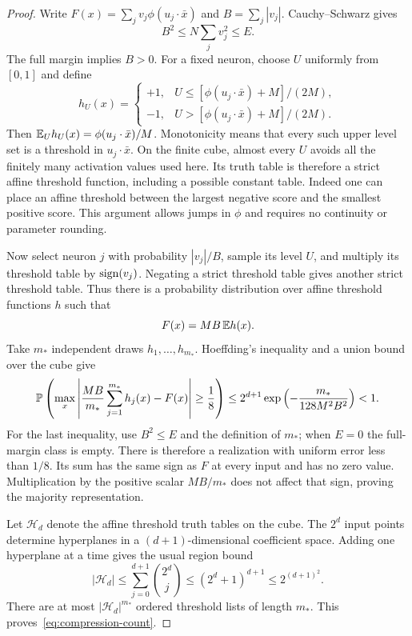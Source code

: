 \begin{proof}
Write $F(x)=\sum_j v_j\phi(u_j\cdot\bar x)$ and
$B=\sum_j|v_j|$. Cauchy--Schwarz gives
\[
 B^2\le N\sum_jv_j^2\le E.
\]
The full margin implies $B>0$.
For a fixed neuron, choose $U$ uniformly from $[0,1]$ and define
\[
 h_U(x)=
 \begin{cases}
 +1,&U\le[\phi(u_j\cdot\bar x)+M]/(2M),\\
 -1,&U>[\phi(u_j\cdot\bar x)+M]/(2M).
 \end{cases}
\]
Then $\mathbb E_U h_U(x)=\phi(u_j\cdot\bar x)/M$.
Monotonicity means that every such upper level set is a threshold in
$u_j\cdot\bar x$. On the finite cube, almost every $U$ avoids all the
finitely many activation values used here. Its truth table is therefore
a strict affine threshold function, including a possible constant table.
Indeed one can place an affine threshold between the largest negative
score and the smallest positive score. This argument allows jumps in
$\phi$ and requires no continuity or parameter rounding.

Now select neuron $j$ with probability $|v_j|/B$, sample its level $U$,
and multiply its threshold table by $\operatorname{sign}(v_j)$. Negating a strict
threshold table gives another strict threshold table. Thus there is a
probability distribution over affine threshold functions $h$ such that
\[
 F(x)=MB\,\mathbb E h(x).
\]
Take $m_*$ independent draws $h_1,\ldots,h_{m_*}$. Hoeffding's inequality
and a union bound over the cube give
\[
 \mathbb P\left(\max_x\left|
    \frac{MB}{m_*}\sum_{j=1}^{m_*}h_j(x)-F(x)
       \right|\ge\frac18\right)
 \le 2^{d+1}\exp\left(-\frac{m_*}{128M^2B^2}\right)<1.
\]
For the last inequality, use $B^2\le E$ and the definition of $m_*$;
when $E=0$ the full-margin class is empty.
There is therefore a realization with uniform error less than $1/8$.
Its sum has the same sign as $F$ at every input and has no zero value.
Multiplication by the positive scalar $MB/m_*$ does not affect that
sign, proving the majority representation.

Let $\mathcal H_d$ denote the affine threshold truth tables on the cube.
The $2^d$ input points determine hyperplanes in a $(d+1)$-dimensional
coefficient space. Adding one hyperplane at a time gives the usual
region bound
\[
 |\mathcal H_d|\le\sum_{j=0}^{d+1}\binom{2^d}{j}
 \le(2^d+1)^{d+1}\le2^{(d+1)^2}.
\]
There are at most $|\mathcal H_d|^{m_*}$ ordered threshold lists of
length $m_*$. This proves~\eqref{eq:compression-count}.
\end{proof}


